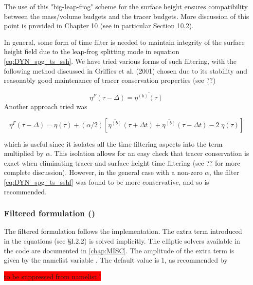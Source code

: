 \documentclass[../main/NEMO_manual]{subfiles}
\begin{document}
The use of this "big-leap-frog" scheme for the surface height ensures compatibility between
the mass/volume budgets and the tracer budgets.
More discussion of this point is provided in Chapter 10 (see in particular Section 10.2). 
 
In general, some form of time filter is needed to maintain integrity of the surface height field due to
the leap-frog splitting mode in equation \autoref{eq:DYN_spg_ts_ssh}.
We have tried various forms of such filtering,
with the following method discussed in Griffies et al. (2001) chosen due to its stability and
reasonably good maintenance of tracer conservation properties (see ??) 

\begin{equation}
  \label{eq:DYN_spg_ts_sshf}
  \eta^{F}(\tau-\Delta) =  \overline{\eta^{(b)}(\tau)}
\end{equation}
Another approach tried was 

\[
  \eta^{F}(\tau-\Delta) = \eta(\tau)
  + (\alpha/2) \left[\overline{\eta^{(b)}}(\tau+\Delta t)
    + \overline{\eta^{(b)}}(\tau-\Delta t) -2 \;\eta(\tau) \right]
\]

which is useful since it isolates all the time filtering aspects into the term multiplied by $\alpha$.
This isolation allows for an easy check that tracer conservation is exact when eliminating tracer and
surface height time filtering (see ?? for more complete discussion).
However, in the general case with a non-zero $\alpha$, the filter \autoref{eq:DYN_spg_ts_sshf} was found to
be more conservative, and so is recommended. 

\subsubsection{Filtered formulation (\protect{})}
\label{subsec:DYN_spg_flt}

The filtered formulation follows the \citet{Roullet2000} implementation.
The extra term introduced in the equations (see {\S}I.2.2) is solved implicitly.
The elliptic solvers available in the code are documented in \autoref{chap:MISC}.
The amplitude of the extra term is given by the namelist variable .
The default value is 1, as recommended by \citet{Roullet2000}

\colorbox{red}{ to be suppressed from namelist !}
\end{document}
